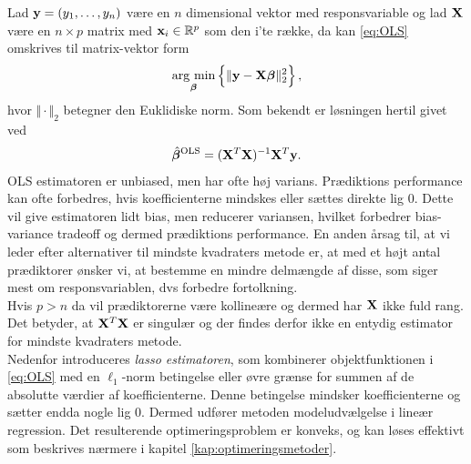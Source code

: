 Lad \(\mathbf{y}=(y_1, \ldots, y_n)\) være en \(n\) dimensional vektor med responsvariable og lad \(\mathbf{X}\) være en $n \times p$ matrix med $\mathbf{x}_i \in \mathbb{R}^p$ som den i'te række, da kan \eqref{eq:OLS} omskrives til matrix-vektor form
\begin{align*}
\argmin_{ \tbeta} \cbr{ \Vert \y - \X \tbeta \Vert_2^2},
\end{align*}
hvor \(\Vert \cdot \Vert_2\) betegner den Euklidiske norm.
Som bekendt er løsningen hertil givet ved
\begin{align*}
\hat{\boldsymbol{\beta}}^{\text{OLS}} = (\mathbf{X}^T \mathbf{X})^{-1} \mathbf{X}^T \mathbf{y}.
\end{align*}
OLS estimatoren er unbiased, men har ofte høj varians. 
Prædiktions performance kan ofte forbedres, hvis koefficienterne mindskes eller sættes direkte lig 0.
Dette vil give estimatoren lidt bias, men reducerer variansen, hvilket forbedrer bias-variance tradeoff og dermed  prædiktions performance.
En anden årsag til, at vi leder efter alternativer til mindste kvadraters metode er, at med et højt antal prædiktorer ønsker vi, at bestemme en mindre delmængde af disse, som siger mest om responsvariablen, dvs forbedre fortolkning.\\[4mm]

Hvis \(p > n\) da vil prædiktorerne være kollineære og dermed har \(\mathbf{X}\) ikke fuld rang.
Det betyder, at $\mathbf{X}^T \mathbf{X}$ er singulær og der findes derfor ikke en entydig estimator for mindste kvadraters metode. \\[4mm]
%
Nedenfor introduceres \textit{lasso estimatoren}, som kombinerer objektfunktionen i \eqref{eq:OLS} med en $\ell_1$-norm betingelse eller øvre grænse for summen af de absolutte værdier af koefficienterne.
Denne betingelse mindsker koefficienterne og sætter endda nogle lig 0. 
Dermed udfører metoden modeludvælgelse i lineær regression.
Det resulterende optimeringsproblem er konveks, og kan løses effektivt som beskrives nærmere i kapitel \ref{kap:optimeringsmetoder}.
%



%